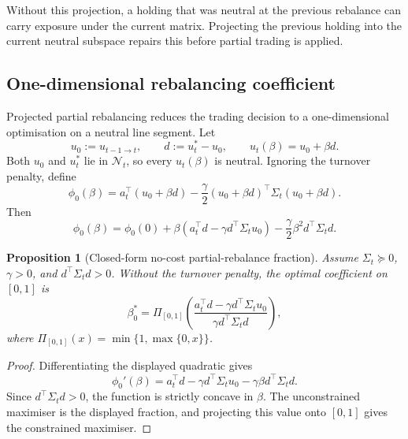 \documentclass[11pt]{article}
\newtheorem{proposition}{Proposition}
\newcommand{\N}{\mathcal{N}}
\begin{document}
Without this projection, a holding that was neutral at the previous rebalance can carry exposure under
the current matrix.  Projecting the previous holding into the current neutral subspace repairs this before
partial trading is applied.

\subsection{One-dimensional rebalancing coefficient}

Projected partial rebalancing reduces the trading decision to a one-dimensional optimisation on a neutral
line segment.  Let
\[
        u_0:=u_{t-1\to t},\qquad d:=u_t^\ast-u_0,\qquad u_t(\beta)=u_0+\beta d.
\]
Both $u_0$ and $u_t^\ast$ lie in $\N_t$, so every $u_t(\beta)$ is neutral.  Ignoring the turnover penalty,
define
\begin{equation}
        \phi_0(\beta)
        =a_t^\top(u_0+\beta d)-\frac{\gamma}{2}(u_0+\beta d)^\top\Sigma_t(u_0+\beta d).
\end{equation}
Then
\begin{equation}
        \phi_0(\beta)=\phi_0(0)+\beta\left(a_t^\top d-\gamma d^\top\Sigma_tu_0\right)
        -\frac{\gamma}{2}\beta^2d^\top\Sigma_td.
\end{equation}

\begin{proposition}[Closed-form no-cost partial-rebalance fraction]
\label{prop:closed-form-beta}
Assume $\Sigma_t\succeq0$, $\gamma>0$, and $d^\top\Sigma_td>0$.  Without the turnover penalty, the
optimal coefficient on $[0,1]$ is
\begin{equation}
        \beta_0^\ast
        =
        \Pi_{[0,1]}
        \left(
        \frac{
        a_t^\top d-\gamma d^\top\Sigma_tu_0
        }{
        \gamma d^\top\Sigma_td
        }
        \right),
\end{equation}
where $\Pi_{[0,1]}(x)=\min\{1,\max\{0,x\}\}$.
\end{proposition}

\begin{proof}
Differentiating the displayed quadratic gives
\[
        \phi_0'(\beta)=a_t^\top d-\gamma d^\top\Sigma_tu_0-\gamma\beta d^\top\Sigma_td.
\]
Since $d^\top\Sigma_td>0$, the function is strictly concave in $\beta$.  The unconstrained maximiser is
the displayed fraction, and projecting this value onto $[0,1]$ gives the constrained maximiser.
\end{proof}
\end{document}
